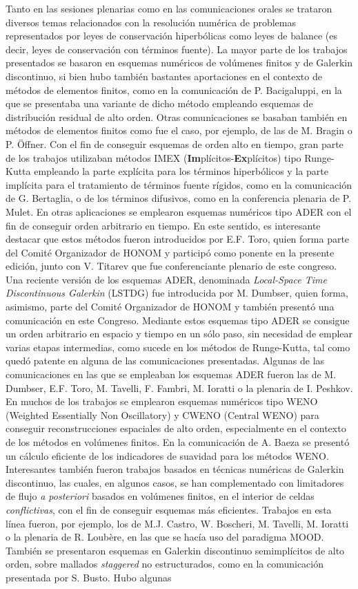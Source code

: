 \documentclass[twoside]{article}
\begin{document}
Tanto en las sesiones plenarias como en las comunicaciones orales se trataron diversos temas relacionados con la resolución numérica de problemas representados por leyes de conservación hiperbólicas como leyes de balance (es decir, leyes de conservación con términos fuente). La mayor parte de los trabajos presentados se basaron en esquemas numéricos de volúmenes finitos y de Galerkin discontinuo, si bien hubo también bastantes aportaciones en el contexto de métodos de elementos finitos, como en la comunicación de P. Bacigaluppi, en la que se presentaba una variante de dicho método empleando esquemas de distribución residual de alto orden. Otras comunicaciones se basaban también en métodos de elementos finitos como fue el caso, por ejemplo, de las de M. Bragin o P. Öffner. Con el fin de conseguir esquemas de orden alto en tiempo, gran parte de los trabajos utilizaban métodos IMEX (\textbf{Im}plícitos-\textbf{Ex}plícitos) tipo Runge-Kutta empleando la parte explícita para los términos hiperbólicos y la parte implícita para el tratamiento de términos fuente rígidos, como en la comunicación de G. Bertaglia, o de los términos difusivos, como en la conferencia plenaria de P. Mulet. En otras aplicaciones se emplearon esquemas numéricos tipo ADER con el fin de conseguir orden arbitrario en tiempo. En este sentido, es interesante destacar que estos métodos fueron introducidos por E.F. Toro, quien forma parte del Comité Organizador de HONOM y participó como ponente en la presente edición, junto con V. Titarev que fue conferenciante plenario de este congreso. Una reciente versión de los esquemas ADER, denominada \textit{Local-Space Time Discontinuous Galerkin} (LSTDG) fue introducida por M. Dumbser, quien forma, asimismo, parte del Comité Organizador de HONOM y también presentó una comunicación en este Congreso. Mediante estos esquemas tipo ADER se consigue un orden arbitrario en espacio y tiempo en un sólo paso, sin necesidad de emplear varias etapas intermedias, como sucede en los métodos de Runge-Kutta, tal como quedó patente en alguna de las comunicaciones presentadas. Algunas de las comunicaciones en las que se empleaban los esquemas ADER fueron las de M. Dumbser, E.F. Toro, M. Tavelli, F. Fambri, M. Ioratti o la plenaria de I. Peshkov. En muchos de los trabajos se emplearon esquemas numéricos tipo WENO (Weighted Essentially Non Oscillatory) y CWENO (Central WENO) para conseguir reconstrucciones espaciales de alto orden, especialmente en el contexto de los métodos en volúmenes finitos. En la comunicación de A. Baeza se presentó un cálculo eficiente de los indicadores de suavidad para los métodos WENO. Interesantes también fueron trabajos basados en técnicas numéricas de Galerkin discontinuo, las cuales, en algunos casos, se han complementado con limitadores de flujo \textit{a posteriori} basados en volúmenes finitos, en el interior de celdas \textit{conflictivas}, con el fin de conseguir esquemas más eficientes. Trabajos en esta línea fueron, por ejemplo, los de M.J. Castro, W. Boscheri, M. Tavelli, M. Ioratti o la plenaria de R. Loubère, en las que se hacía uso del paradigma MOOD. También se presentaron esquemas en Galerkin discontinuo semimplícitos de alto orden, sobre mallados \textit{staggered} no estructurados, como en la comunicación presentada por S. Busto. Hubo algunas 
\end{document}
